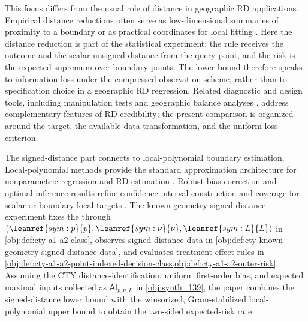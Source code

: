 \documentclass[11pt]{article}
\begin{document}
This focus differs from the usual role of distance in geographic RD applications. Empirical distance reductions often serve as low-dimensional summaries of proximity to a boundary or as practical coordinates for local fitting \citep{Keele2015a,Keele2015b,Keele2016,Kendall2026}. Here the distance reduction is part of the statistical experiment: the rule receives the outcome and the scalar unsigned distance from the query point, and the risk is the expected supremum over boundary points. The lower bound therefore speaks to information loss under the compressed observation scheme, rather than to specification choice in a geographic RD regression. Related diagnostic and design tools, including manipulation tests and geographic balance analyses \citep{McCrary2008,Cattaneo2022,Cattaneo2020,Cattaneo2023,Cattaneo2025}, address complementary features of RD credibility; the present comparison is organized around the target, the available data transformation, and the uniform loss criterion.

The signed-distance part connects to local-polynomial boundary estimation. Local-polynomial methods provide the standard approximation architecture for nonparametric regression and RD estimation \citep{Fan1996,Ruppert1994,Calonico2014,Calonico2020,Imbens2019}. Robust bias correction and optimal inference results refine confidence interval construction and coverage for scalar or boundary-local targets \citep{Calonico2014,Calonico2020,Armstrong2020,Kolesar2018}. The known-geometry signed-distance experiment fixes the  through \((\leanref{sym:p}{\ensuremath{p}},\leanref{sym:\nu}{\ensuremath{\nu}},\leanref{sym:L}{\ensuremath{L}})\) in \cref{obj:def:cty-a1-a2-class}, observes signed-distance data in \cref{obj:def:cty-known-geometry-signed-distance-data}, and evaluates treatment-effect rules in \cref{obj:def:cty-a1-a2-point-indexed-decision-class,obj:def:cty-a1-a2-outer-risk}. Assuming the CTY distance-identification, uniform first-order bias, and expected maximal inputs collected as \(\mathsf{AI}_{p,\nu,L}\) in \cref{obj:synth_139}, the paper combines the signed-distance lower bound with the winsorized, Gram-stabilized local-polynomial upper bound to obtain the two-sided expected-risk rate.
\end{document}
